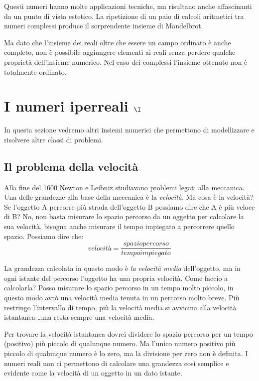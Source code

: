 Questi numeri hanno molte applicazioni tecniche, ma risultano anche 
affascinanti da un punto di vista estetico. La ripetizione di un paio di 
calcoli aritmetici tra numeri complessi produce il sorprendente insieme di 
Mandelbrot.

Ma dato che l'insieme dei reali oltre che essere un campo ordinato è anche 
completo, non è possibile aggiungere elementi ai reali senza perdere qualche 
proprietà dell'insieme numerico. Nel caso dei complessi l'insieme ottenuto non 
è totalmente ordinato.


\section{I numeri iperreali $\I$}
\label{sec:insnum_iperreali}

In questa sezione vedremo altri insiemi numerici che permettono di 
modellizzare e risolvere altre classi di problemi.

\subsection{Il problema della velocità}
\label{subsec:insnum_velocita}

Alla fine del 1600 Newton e Leibniz studiavano problemi legati alla meccanica. 
Una delle grandezze alla base della meccanica è la \emph{velocità}. Ma cosa è 
la velocità? Se l'oggetto A percorre più strada dell'oggetto B possiamo dire 
che A è più veloce di B? No, non basta misurare lo spazio percorso da un 
oggetto per calcolare la sua velocità, bisogna anche misurare il tempo 
impiegato a percorrere quello spazio. Possiamo dire che:
\[velocità = \frac{spazio percorso}{tempo impiegato}\]

La grandezza calcolata in questo modo è \emph{la velocità media} dell'oggetto, 
ma in ogni istante del percorso l'oggetto ha una propria velocità. Come faccio 
a calcolarla? Posso misurare lo spazio percorso in un tempo molto piccolo, in 
questo modo avrò una velocità media tenuta in un percorso molto breve. Più 
restringo l'intervallo di tempo, più la velocità media si avvicina alla 
velocità istantanea \dots ma resta sempre una velocità media. 

Per trovare la velocità istantanea dovrei dividere lo spazio percorso per un 
tempo (positivo) più piccolo di qualunque numero. Ma l'unico numero 
positivo più piccolo di qualunque numero è lo zero, ma la divisione per 
zero non è definita. I numeri reali non ci permettono di calcolare una 
grandezza così semplice e evidente come la velocità di un oggetto in un dato 
istante.

